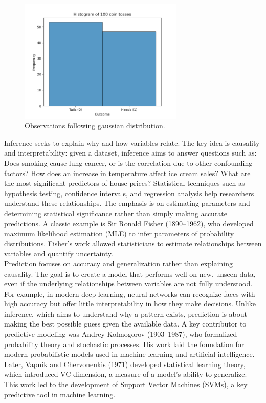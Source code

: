 \documentclass{book}
\begin{document}
\begin{figure}[ht]
    \centering
    \includegraphics[width=0.7\textwidth]{figures/chapter4/t_1_sample_observations.png}
    \caption{Observations following gaussian distribution.}
    \label{fig:t_1_sample_obs}
\end{figure}

Inference seeks to explain why and how variables relate. The key idea is causality and interpretability: given a dataset, inference aims to answer questions such as: Does smoking cause lung cancer, or is the correlation due to other confounding factors? How does an increase in temperature affect ice cream sales? What are the most significant predictors of house prices? Statistical techniques such as hypothesis testing, confidence intervals, and regression analysis help researchers understand these relationships. The emphasis is on estimating parameters and determining statistical significance rather than simply making accurate predictions. A classic example is Sir Ronald Fisher (1890–1962), who developed maximum likelihood estimation (MLE) to infer parameters of probability distributions. Fisher’s work allowed statisticians to estimate relationships between variables and quantify uncertainty.\\

Prediction focuses on accuracy and generalization rather than explaining causality. The goal is to create a model that performs well on new, unseen data, even if the underlying relationships between variables are not fully understood. For example, in modern deep learning, neural networks can recognize faces with high accuracy but offer little interpretability in how they make decisions. Unlike inference, which aims to understand why a pattern exists, prediction is about making the best possible guess given the available data. A key contributor to predictive modeling was Andrey Kolmogorov (1903–1987), who formalized probability theory and stochastic processes. His work laid the foundation for modern probabilistic models used in machine learning and artificial intelligence. Later, Vapnik and Chervonenkis (1971) developed statistical learning theory, which introduced VC dimension, a measure of a model’s ability to generalize. This work led to the development of Support Vector Machines (SVMs), a key predictive tool in machine learning.\\
\end{document}
